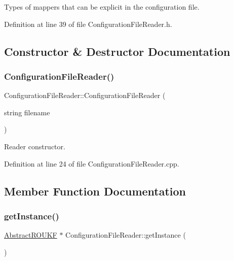 Types of mappers that can be explicit in the configuration file. 

Definition at line 39 of file Configuration\+File\+Reader.\+h.



\subsection{Constructor \& Destructor Documentation}
\mbox{\label{classConfigurationFileReader_ad85a4de7a5b87fcddb1c27de9b3ef332}} 
\subsubsection{\texorpdfstring{Configuration\+File\+Reader()}{ConfigurationFileReader()}}
{\footnotesize\ttfamily Configuration\+File\+Reader\+::\+Configuration\+File\+Reader (\begin{DoxyParamCaption}\item[{string}]{filename }\end{DoxyParamCaption})}

Reader constructor. 

Definition at line 24 of file Configuration\+File\+Reader.\+cpp.



\subsection{Member Function Documentation}
\mbox{\label{classConfigurationFileReader_a2bea7f730d5caf67b9d3e1bf45072542}} 
\subsubsection{\texorpdfstring{get\+Instance()}{getInstance()}}
{\footnotesize\ttfamily \mbox{\hyperlink{classAbstractROUKF}{Abstract\+R\+O\+U\+KF}} $\ast$ Configuration\+File\+Reader\+::get\+Instance (\begin{DoxyParamCaption}{ }\end{DoxyParamCaption})}

